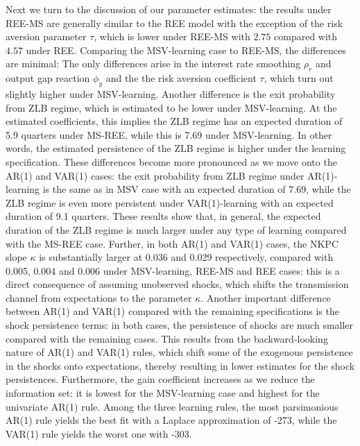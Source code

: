 \documentclass[12pt,reqno]{article}
\numberwithin{equation}{section}
\begin{document}
Next we turn to the discussion of our parameter estimates: the results under REE-MS are generally similar to the REE model with the exception of the risk aversion parameter $\tau$, which is lower under REE-MS with $2.75 $ compared with $4.57 $ under REE. Comparing the MSV-learning case to REE-MS, the differences are minimal: The only differences arise in the interest rate smoothing $\rho_r$ and output gap reaction $\phi_y$ and the the risk aversion  coefficient $\tau$, which turn out slightly higher under MSV-learning. Another difference is the exit probability from ZLB regime, which is estimated to be lower under MSV-learning. At the estimated coefficients, this implies the ZLB regime has an expected duration of  5.9 quarters under MS-REE, while this is 7.69 under MSV-learning. In other words, the estimated persistence of the ZLB regime is higher under the learning specification. These differences become more pronounced as we move onto the AR(1) and VAR(1) cases: the exit probability from ZLB regime under AR(1)-learning is the same as in MSV case with an expected duration of 7.69, while the ZLB regime is even more persistent under VAR(1)-learning with an expected duration of 9.1 quarters. These results show that, in general, the expected duration of the ZLB regime is much larger under any type of learning compared with the MS-REE case. Further, in both AR(1) and VAR(1) cases, the NKPC slope $\kappa$ is substantially larger at 0.036 and 0.029 respectively, compared with 0.005, 0.004 and 0.006 under MSV-learning, REE-MS and REE cases: this is a direct consequence of assuming unobserved shocks, which shifts the transmission channel from expectations to the parameter $\kappa$. Another important difference between AR(1) and VAR(1) compared with the remaining specifications is the shock persistence terms: in both cases, the persistence of shocks are much smaller compared with the remaining cases. This results from the backward-looking nature of AR(1) and VAR(1) rules, which shift some of the exogenous persistence in the shocks onto expectations, thereby resulting in lower estimates for the shock persistences. Furthermore, the gain coefficient increases as we reduce the information set: it is lowest for the MSV-learning case and highest for the univariate AR(1) rule. Among the three learning rules, the most parsimonious AR(1) rule yields the best fit with a Laplace approximation of -273, while the VAR(1) rule yields the worst one with -303. \\
\noindent
\end{document}
